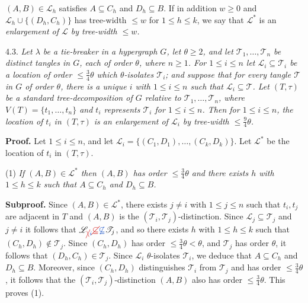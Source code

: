\noindent $(A, B) \in \mathscr{L}_h$ satisfies $A \subseteq C_h$ and $D_h \subseteq B$. If in addition $w \ge 0$ and $\mathscr{L}_h \cup \{(D_h, C_h)\}$ has tree-width $\le w$ for $1 \le h \le k$, we say that $\mathscr{L}^*$ is an \textit{enlargement of $\mathscr{L}$ by tree-width $\le w$.}

4.3. \textit{Let $\lambda$ be a tie-breaker in a hypergraph $G$, let $\theta \ge 2$, and let $\mathscr{T}_1, \dots, \mathscr{T}_n$ be distinct tangles in $G$, each of order $\theta$, where $n \ge 1$. For $1 \le i \le n$ let $\mathscr{L}_i \subseteq \mathscr{T}_i$ be a location of order $\le \frac{3}{4}\theta$ which $\theta$-isolates $\mathscr{T}_i$; and suppose that for every tangle $\mathscr{T}$ in $G$ of order $\theta$, there is a unique $i$ with $1 \le i \le n$ such that $\mathscr{L}_i \subseteq \mathscr{T}$. Let $(T, \tau)$ be a standard tree-decomposition of $G$ relative to $\mathscr{T}_1, \dots, \mathscr{T}_n$, where $V(T) = \{t_1, \dots, t_n\}$ and $t_i$ represents $\mathscr{T}_i$ for $1 \le i \le n$. Then for $1 \le i \le n$, the location of $t_i$ in $(T, \tau)$ is an enlargement of $\mathscr{L}_i$ by tree-width $\le \frac{9}{4}\theta$.}

\textbf{Proof.} Let $1 \le i \le n$, and let $\mathscr{L}_i = \{(C_1, D_1), \dots, (C_k, D_k)\}$. Let $\mathscr{L}^*$ be the location of $t_i$ in $(T, \tau)$.

\hspace*{12pt}(1) \textit{If $(A, B) \in \mathscr{L}^*$ then $(A, B)$ has order $\le \frac{3}{4}\theta$ and there exists $h$ with $1 \le h \le k$ such that $A \subseteq C_h$ and $D_h \subseteq B$.}

\textbf{Subproof.} Since $(A, B) \in \mathscr{L}^*$, there exists $j \ne i$ with $1 \le j \le n$ such that $t_i, t_j$ are adjacent in $T$ and $(A, B)$ is the $(\mathscr{T}_i, \mathscr{T}_j)$-distinction. Since $\mathscr{L}_j \subseteq \mathscr{T}_j$ and $j \ne i$ it follows that $\mathscr{L}_{\delm{\backslash}\fix{i}} \delm{\subseteq}\fix{\not\subseteq} \mathscr{T}_j$, and so there exists $h$ with $1 \le h \le k$ such that $(C_h, D_h) \notin \mathscr{T}_j$. Since $(C_h, D_h)$ has order $\le \frac{3}{4}\theta < \theta$, and $\mathscr{T}_j$ has order $\theta$, it follows that $(D_h, C_h) \in \mathscr{T}_j$. Since $\mathscr{L}_i$ $\theta$-isolates $\mathscr{T}_i$, we deduce that $A \subseteq C_h$ and $D_h \subseteq B$. Moreover, since $(C_h, D_h)$ distinguishes $\mathscr{T}_i$ from $\mathscr{T}_j$ and has order $\le \frac{3}{4}\theta$, it follows that the $(\mathscr{T}_i, \mathscr{T}_j)$-distinction $(A, B)$ also has order $\le \frac{3}{4}\theta$. This proves (1).

